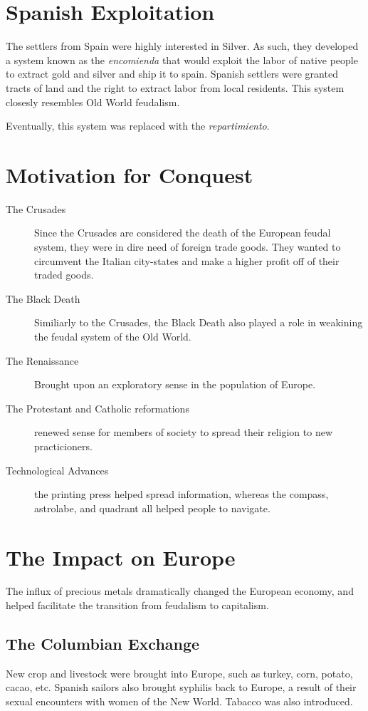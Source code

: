 \section{Spanish Exploitation}
The settlers from Spain were highly interested in Silver.  As such, they
developed a system known as the \textit{encomienda} that would exploit the labor
of native people to extract gold and silver and ship it to spain.  Spanish
settlers were granted tracts of land and the right to extract labor from local
residents.  This system closesly resembles Old World feudalism.

Eventually, this system was replaced with the \textit{repartimiento}.

\section{Motivation for Conquest}
\begin{description}
  \item[The Crusades] Since the Crusades are considered the death of the
    European feudal system, they were in dire need of foreign trade goods.  They
    wanted to circumvent the Italian city-states and make a higher profit off of
    their traded goods.
  \item[The Black Death] Similiarly to the Crusades, the Black Death also played
    a role in weakining the feudal system of the Old World.
  \item[The Renaissance] Brought upon an exploratory sense in the population of
    Europe.
  \item[The Protestant and Catholic reformations] renewed sense for members of
    society to spread their religion to new practicioners.
  \item[Technological Advances] the printing press helped spread information,
    whereas the compass, astrolabe, and quadrant all helped people to navigate.
\end{description}

\section{The Impact on Europe}
The influx of precious metals dramatically changed the European economy, and
helped facilitate the transition from feudalism to capitalism.

\subsection{The Columbian Exchange}
New crop and livestock were brought into Europe, such as turkey, corn, potato,
cacao, etc.  Spanish sailors also brought syphilis back to Europe, a result of
their sexual encounters with women of the New World.  Tabacco was also
introduced.

